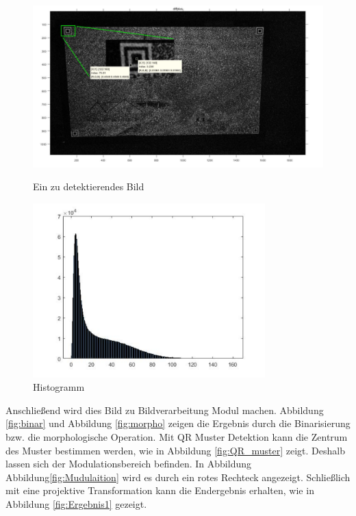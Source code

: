 \begin{figure}[H]
\centering 
\begin{minipage}[b]{0.49\textwidth} 
\centering 
\includegraphics[width=1.0\textwidth]{images/5_Implementirung/nachdiff.pdf} 
\caption{Ein zu detektierendes Bild}
\label{fig:nachdiff}
\end{minipage}
\begin{minipage}[b]{0.49\textwidth} 
\centering 
\includegraphics[width=0.8\textwidth]{images/5_Implementirung/histodiff.pdf}
\caption{Histogramm}
\label{fig:Histogramm}
\end{minipage}
\end{figure}

Anschließend wird dies Bild zu Bildverarbeitung Modul machen. Abbildung \ref{fig:binar} und Abbildung \ref{fig:morpho} zeigen die Ergebnis durch die Binarisierung bzw. die morphologische Operation.
Mit QR Muster Detektion kann die Zentrum des Muster bestimmen werden, wie in Abbildung \ref{fig:QR_muster} zeigt. Deshalb lassen sich der Modulationsbereich befinden. In Abbildung Abbildung\ref{fig:Mudulaition} wird es durch ein rotes Rechteck angezeigt. Schließlich mit eine projektive Transformation kann die Endergebnis erhalten, wie in Abbildung \ref{fig:Ergebnis1} gezeigt.

